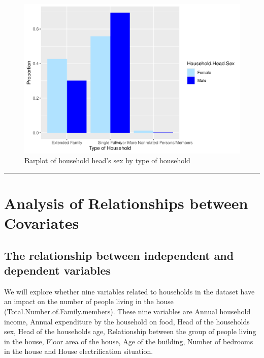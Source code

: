 \documentclass[
]{article}
\begin{document}
\begin{figure}[H]

{\centering \includegraphics[width=0.8\linewidth]{Group_01_Project2_demo_files/figure-latex/barplot of sex by type of household-1} 

}

\caption{Barplot of household head's sex by type of household}\label{fig:barplot of sex by type of household}
\end{figure}

\begin{center}\rule{0.5\linewidth}{0.5pt}\end{center}

\newpage

\hypertarget{sec:ARC}{%
\section{Analysis of Relationships between Covariates}\label{sec:ARC}}

\hypertarget{the-relationship-between-independent-and-dependent-variables}{%
\subsection{The relationship between independent and dependent
variables}\label{the-relationship-between-independent-and-dependent-variables}}

We will explore whether nine variables related to households in the
dataset have an impact on the number of people living in the house
(Total.Number.of.Family.members). These nine variables are Annual
household income, Annual expenditure by the household on food, Head of
the households sex, Head of the households age, Relationship between the
group of people living in the house, Floor area of the house, Age of the
building, Number of bedrooms in the house and House electrification
situation.
\end{document}
